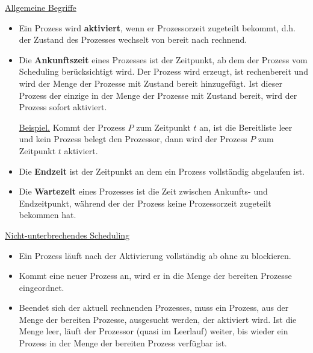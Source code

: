 \documentclass{uebungsblatt}
\begin{document}
\underline{Allgemeine Begriffe}

\begin{itemize}

\item
Ein Prozess wird \textbf{aktiviert}, wenn er Prozessorzeit zugeteilt bekommt,
d.h. der Zustand des Prozesses wechselt von bereit nach rechnend.

\item
Die \textbf{Ankunftszeit} eines Prozesses ist der Zeitpunkt,
ab dem der Prozess vom Scheduling berücksichtigt wird. 
Der Prozess wird erzeugt, ist rechenbereit und wird der Menge der Prozesse 
mit Zustand bereit hinzugefügt. Ist dieser Prozess der einzige in der Menge der Prozesse 
mit Zustand bereit, wird der Prozess sofort aktiviert.

\underline{Beispiel.} Kommt der Prozess $P$ zum Zeitpunkt $t$ an, 
ist die Bereitliste leer und kein Prozess belegt den Prozessor, 
dann wird der Prozess $P$ zum Zeitpunkt $t$ aktiviert. 

\item
Die \textbf{Endzeit} ist der Zeitpunkt an dem ein Prozess vollständig abgelaufen ist.

\item
Die \textbf{Wartezeit} eines Prozesses ist die Zeit zwischen Ankunfts- und Endzeitpunkt,
während der der Prozess keine Prozessorzeit zugeteilt bekommen hat.

\end{itemize}

\medskip
\underline{Nicht-unterbrechendes Scheduling}

\begin{itemize}
\item
Ein Prozess läuft nach der Aktivierung vollständig ab ohne zu blockieren.
\item
Kommt eine neuer Prozess an, wird er in die Menge der bereiten Prozesse eingeordnet.
\item
Beendet sich der aktuell rechnenden Prozesses, muss ein Prozess,
aus der Menge der bereiten Prozesse, ausgesucht werden, der aktiviert wird.
Ist die Menge leer, läuft der Prozessor (quasi im Leerlauf) weiter,
bis wieder ein Prozess in der Menge der bereiten Prozess verfügbar ist.
\end{itemize}
\end{document}
